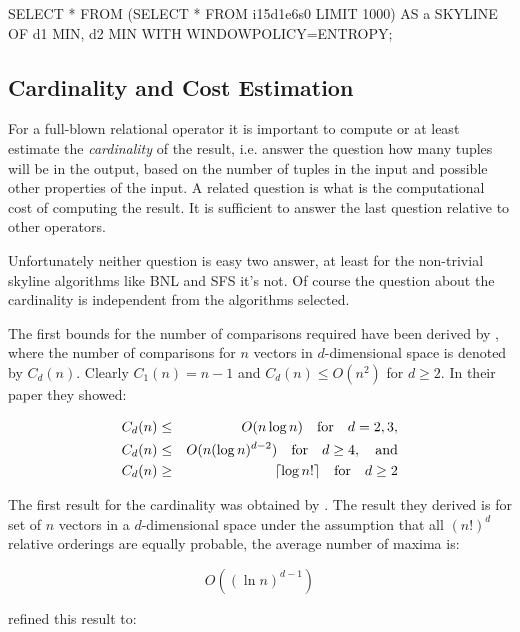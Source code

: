 \begin{interactive}
SELECT * 
FROM 
    (SELECT * FROM i15d1e6s0 LIMIT 1000) AS a 
SKYLINE OF d1 MIN, d2 MIN WITH WINDOWPOLICY=ENTROPY;
\end{interactive}

\subsection{Cardinality and Cost Estimation}
\label{sec:cardinality-and-cost-estimation}
For a full-blown relational operator it is important to compute or at
least estimate the \emph{cardinality} of the result, i.e. answer the
question how many tuples will be in the output, based on the number of
tuples in the input and possible other properties of the input.  A
related question is what is the computational cost of computing the
result.  It is sufficient to answer the last question relative to
other operators.  

Unfortunately neither question is easy two answer, at least for the
non-trivial skyline algorithms like BNL and SFS it's not. Of course
the question about the cardinality is independent from the algorithms
selected.

The first bounds for the number of comparisons required have been
derived by \citet{Kung1975}, where the number of comparisons for
$n$ vectors in $d$-dimensional space is denoted by $C_d(n)$. 
Clearly $C_1(n) = n - 1$ and $C_d(n) \le O(n^2)$ for $d \ge 2$.
In their paper they showed:

\begin{eqnarray}
C_d(n) &\le& O(n \log n) \quad \textnormal{for} \quad d = 2, 3, \\
C_d(n) &\le& O(n (\log n)^{d-2}) \quad \textnormal{for} \quad d \ge 4, \quad \textnormal{and} \\
C_d(n) &\ge& \lceil\log n!\rceil \quad \textnormal{for} \quad d \ge 2
\end{eqnarray}

The first result for the cardinality was obtained by
\cite{Bentley1978}.  The result they derived is for set of $n$ vectors
in a $d$-dimensional space under the assumption that all $(n!)^d$
relative orderings are equally probable, the average number of maxima
is:

\begin{equation}
O((\ln n)^{d-1})
\end{equation}

\noindent
\citet{Buchta1989} refined this result to:

